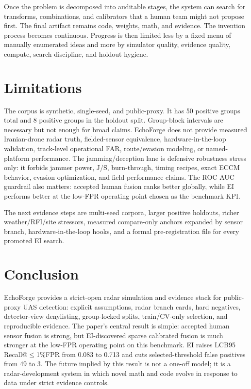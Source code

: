 \documentclass[10pt,journal]{IEEEtran}
\makeatletter
\newcommand{\PrimaryKPI}{LCB95 Recall@$\leq$1\%FPR}
\newcommand{\MetricPositiveGroups}{50}
\newcommand{\MetricHoldoutPositiveGroups}{8}
\newcommand{\MetricPriorLcb}{0.083}
\newcommand{\MetricEiLcb}{0.713}
\newcommand{\MetricPriorSelectedFP}{49}
\newcommand{\MetricEiSelectedFP}{3}
\makeatother
\begin{document}
Once the problem is decomposed into auditable stages, the system can search for transforms, combinations, and calibrators that a human team might not propose first. The final artifact remains code, weights, math, and evidence. The invention process becomes continuous. Progress is then limited less by a fixed menu of manually enumerated ideas and more by simulator quality, evidence quality, compute, search discipline, and holdout hygiene.

\section{Limitations}
The corpus is synthetic, single-seed, and public-proxy. It has \MetricPositiveGroups{} positive groups total and \MetricHoldoutPositiveGroups{} positive groups in the holdout split. Group-block intervals are necessary but not enough for broad claims. EchoForge does not provide measured Iranian-drone radar truth, fielded-sensor equivalence, hardware-in-the-loop validation, track-level operational FAR, route/evasion modeling, or named-platform performance. The jamming/deception lane is defensive robustness stress only: it forbids jammer power, J/S, burn-through, timing recipes, exact ECCM behavior, evasion optimization, and field-performance claims. The ROC AUC guardrail also matters: accepted human fusion ranks better globally, while EI performs better at the low-FPR operating point chosen as the benchmark KPI.

The next evidence steps are multi-seed corpora, larger positive holdouts, richer weather/RFI/site stressors, measured compare-only anchors expanded by sensor branch, hardware-in-the-loop hooks, and a formal pre-registration file for every promoted EI search.

\section{Conclusion}
EchoForge provides a strict-open radar simulation and evidence stack for public-proxy UAS detection: explicit assumptions, radar branch cards, hard negatives, detector-view denylisting, group-locked splits, train/CV-only selection, and reproducible evidence. The paper's central result is simple: accepted human sensor fusion is strong, but EI-discovered sparse calibrated fusion is much stronger at the low-FPR operating point on this benchmark. EI raises \PrimaryKPI{} from \MetricPriorLcb{} to \MetricEiLcb{} and cuts selected-threshold false positives from \MetricPriorSelectedFP{} to \MetricEiSelectedFP{}. The future implied by this result is not a one-off model; it is a radar-development system in which novel math and code evolve in response to data under strict evidence controls.
\end{document}
